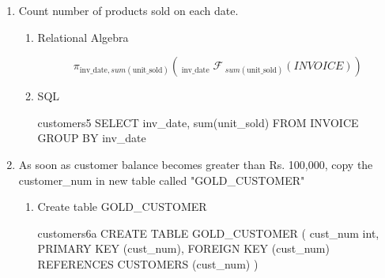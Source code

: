 \begin{enumerate}
\begin{enumerate}
                    \begin{sqlQuery}{customer4c}
                    SELECT CONCAT(C.cust_fname, " ", C.cust_lname) as name
                    LEFT JOIN INVOICE i
                    ON C.cust_num=i.cust_num
                    UNION
                    SELECT CONCAT(C.cust_fname, " ", C.cust_lname) as name, i.inv_amount
                    RIGHT JOIN INVOICE i
                    ON C.cust_num=i.cust_num
                    \end{sqlQuery}

          \end{enumerate}

    \item Count number of products sold on each date.

          \begin{enumerate}
              \item Relational Algebra

                    \begin{equation*}
                        \pi_{\text{inv\_date}, sum(\text{unit\_sold})}({}_{\; \text{inv\_date}} \; \mathcal{F}_{\; sum(\text{unit\_sold})} (INVOICE))
                    \end{equation*}

                    \pagebreak
              \item SQL

                    \begin{sqlQuery}{customers5}
                        SELECT inv_date, sum(unit_sold)
                        FROM INVOICE
                        GROUP BY inv_date
                    \end{sqlQuery}

          \end{enumerate}

    \item As soon as customer balance becomes greater than Rs. 100,000, copy the customer\_num in new table
          called "GOLD\_CUSTOMER"

          \begin{enumerate}
              \item Create table GOLD\_CUSTOMER

                    \begin{sqlQuery}{customers6a}
                        CREATE TABLE GOLD_CUSTOMER
                        (
                            cust_num int,
                            PRIMARY KEY (cust_num),
                            FOREIGN KEY (cust_num) REFERENCES CUSTOMERS (cust_num)
                        )
                    \end{sqlQuery}


\end{enumerate}
\end{enumerate}
